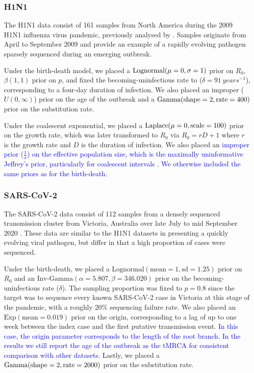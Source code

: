 \documentclass[12pt]{article}
\begin{document}
\begin{spacing}{2}
\subsubsection*{H1N1}
The H1N1 data consist of 161 samples from North America during the 2009 H1N1 influenza virus pandemic, previously analysed by \citet{hedge_2013_real-time}. Samples originate from April to September 2009 and provide an example of a rapidly evolving pathogen sparsely sequenced during an emerging outbreak. 

Under the birth-death model, we placed a $\textnormal{Lognormal}(\mu=0,\sigma=1)$ prior on $R_0$, $\beta(1,1)$ prior on $p$, and fixed the becoming-uninfectious rate to ($\delta = 91\ years^{-1}$), corresponding to a four-day duration of infection. We also placed an improper ($U(0,\infty)$) prior on the age of the outbreak and a $\textnormal{Gamma}(\textnormal{shape}=2,\textnormal{rate}=400)$ prior on the substitution rate.

Under the coalescent exponential, we placed a $\textnormal{Laplace}(\mu=0,\textnormal{scale}=100)$ prior on the growth rate, which was later transformed to $R_0$ via $R_0 = rD+1$ where $r$ is the growth rate and $D$ is the duration of infection. We also placed an \textcolor{blue}{improper prior ($\frac{1}{x}$) on the effective population size, which is the maximally uninformative Jeffrey's prior, particularly for coalescent intervals \citep{drummond_estimating_2002}. We otherwise included the same priors as for the birth-death.}



\subsubsection*{SARS-CoV-2}
The SARS-CoV-2 data consist of 112 samples from a densely sequenced transmission cluster from Victoria, Australia over late July to mid September 2020 \citet{lane2021genomics}. These data are similar to the H1N1 datasets in presenting a quickly evolving viral pathogen, but differ in that a high proportion of cases were sequenced.

Under the birth-death, we placed a $\textrm{Lognormal}(\textrm{mean}=1, \textrm{sd}=1.25)$ prior on $R_0$ and an $\textrm{Inv-Gamma}(\alpha=5.807, \beta=346.020)$ prior on the becoming-uninfectious rate ($\delta$). The sampling proportion was fixed to $p=0.8$ since the target was to sequence every known SARS-CoV-2 case in Victoria at this stage of the pandemic, with a roughly 20\% sequencing failure rate. We also placed an $\textrm{Exp}(\textrm{mean}=0.019)$ prior on the origin, corresponding to a lag of up to one week  between the index case and the first putative transmission event. \textcolor{blue}{In this case, the origin parameter corresponds to the length of the root branch. In the results we still report the age of the outbreak as the tMRCA for consistent comparison with other datasets.} Lastly, we placed a $\textnormal{Gamma}(\textnormal{shape}=2,\textnormal{rate}=2000)$ prior on the substitution rate.


\end{spacing}
\end{document}
